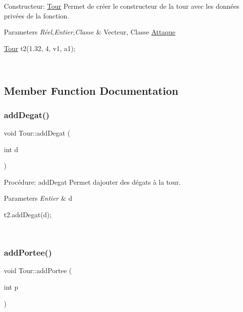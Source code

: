 Constructeur\+: \hyperlink{classTour}{Tour} Permet de créer le constructeur de la tour avec les données privées de la fonction. 


\begin{DoxyParams}{Parameters}
{\em Réel,Entier,Classe} & Vecteur, Classe \hyperlink{classAttaque}{Attaque} 
\begin{DoxyCode}
\hyperlink{classTour}{Tour} t2(1.32, 4, v1, a1);
\end{DoxyCode}
 \\
\hline
\end{DoxyParams}


\subsection{Member Function Documentation}
\mbox{\label{classTour_a61f75da2910e077d28121b04f7e6e747}} 
\subsubsection{\texorpdfstring{add\+Degat()}{addDegat()}}
{\footnotesize\ttfamily void Tour\+::add\+Degat (\begin{DoxyParamCaption}\item[{int}]{d }\end{DoxyParamCaption})}



Procédure\+: add\+Degat Permet d\textquotesingle{}ajouter des dégats à la tour. 


\begin{DoxyParams}{Parameters}
{\em Entier} & d 
\begin{DoxyCode}
t2.addDegat(d);
\end{DoxyCode}
 \\
\hline
\end{DoxyParams}
\mbox{\label{classTour_af6ead0d33253a3400b65efb1a576d215}} 
\subsubsection{\texorpdfstring{add\+Portee()}{addPortee()}}
{\footnotesize\ttfamily void Tour\+::add\+Portee (\begin{DoxyParamCaption}\item[{int}]{p }\end{DoxyParamCaption})}



